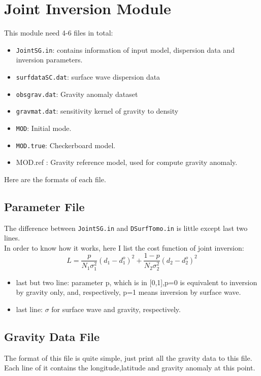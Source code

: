 \documentclass[UTF8]{article}
\begin{document}
    \section{Joint Inversion Module}
    This module need 4-6 files in total:
    \begin{itemize}
        \item \verb!JointSG.in!: contains information of input model, dispersion data and inversion parameters.
        \item \verb!surfdataSC.dat!: surface wave dispersion data
        \item \verb!obsgrav.dat!: Gravity anomaly dataset
        \item \verb!gravmat.dat!: sensitivity kernel of gravity to density
        \item \verb!MOD!: Initial mode.
        \item \verb!MOD.true!: Checkerboard model.
        \item MOD.ref : Gravity reference model, used for compute gravity anomaly.
    \end{itemize}
    Here are the formats of each file.

    \subsection{Parameter File}
    The difference between \verb!JointSG.in! and \verb!DSurfTomo.in! is little except
    last two lines.\\


    In order to know how it works, here I list the cost function of joint inversion:
    \[
        L = \frac{p}{N_1 \sigma_1^2} (d_1- d_1^o)^2 + 
            \frac{1-p}{N_2 \sigma_2^2} (d_2- d_2^o)^2 \tag{1}
    \]
    \begin{itemize}
        \item last but two line: parameter p, which is in [0,1],p=0 is equivalent to 
                                inversion by gravity only, and, respectively, p=1 means 
                                inversion by surface wave.
        \item last line: $\sigma$ for surface wave and gravity, respectively.
    \end{itemize}

    \subsection{Gravity Data File}
    The format of this file is quite simple, just print all the gravity data to this file.
    Each line of it contains the longitude,latitude and gravity anomaly at this point. \\
\end{document}
